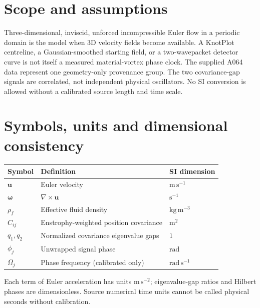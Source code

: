\documentclass[11pt,a4paper]{article}
\newcommand{\rhoF}{\rho_{\!f}}
\begin{document}
\section{Scope and assumptions}
Three-dimensional, inviscid, unforced incompressible Euler flow in a periodic domain is the model when 3D velocity fields become available. A KnotPlot centreline, a Gaussian-smoothed starting field, or a two-wavepacket detector curve is not itself a measured material-vortex phase clock. The supplied A064 data represent one geometry-only provenance group. The two covariance-gap signals are correlated, not independent physical oscillators. No SI conversion is allowed without a calibrated source length and time scale.

\section{Symbols, units and dimensional consistency}
\begin{longtable}{lll}
\toprule Symbol & Definition & SI dimension\\\midrule
$\mathbf u$ & Euler velocity & $\mathrm{m\,s^{-1}}$\\
$\bm\omega$ & $\nabla\times\mathbf u$ & $\mathrm{s^{-1}}$\\
$\rhoF$ & Effective fluid density & $\mathrm{kg\,m^{-3}}$\\
$C_{ij}$ & Enstrophy-weighted position covariance & $\mathrm{m^2}$\\
$q_1,q_2$ & Normalized covariance eigenvalue gaps & $1$\\
$\phi_j$ & Unwrapped signal phase & $\mathrm{rad}$\\
$\Omega_j$ & Phase frequency (calibrated only) & $\mathrm{rad\,s^{-1}}$\\\bottomrule
\end{longtable}
Each term of Euler acceleration has units $\mathrm{m\,s^{-2}}$; eigenvalue-gap ratios and Hilbert phases are dimensionless. Source numerical time units cannot be called physical seconds without calibration.

\end{document}
